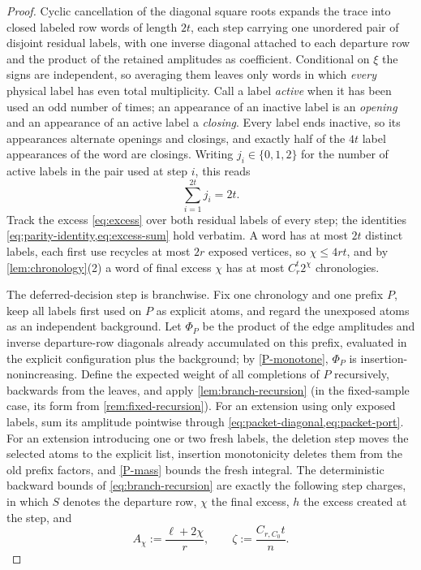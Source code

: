 \documentclass[11pt]{article}
\theoremstyle{definition}
\theoremstyle{remark}
\newcommand{\1}{\mathbf 1}
\numberwithin{equation}{section}
\begin{document}
\begin{proof}
Cyclic cancellation of the diagonal square roots expands the trace into
closed labeled row words of length $2t$, each step carrying one
unordered pair of disjoint residual labels, with one inverse diagonal
attached to each departure row and the product of the retained
amplitudes as coefficient.  Conditional on $\xi$ the signs are
independent, so averaging them leaves only words in which \emph{every}
physical label has even total multiplicity.  Call a label \emph{active}
when it has been used an odd number of times; an appearance of an
inactive label is an \emph{opening} and an appearance of an active
label a \emph{closing}.  Every label ends inactive, so its appearances
alternate openings and closings, and exactly half of the $4t$ label
appearances of the word are closings.  Writing $j_i\in\{0,1,2\}$ for
the number of active labels in the pair used at step $i$, this reads
\begin{equation}\label{eq:pair-parity}
 \sum_{i=1}^{2t}j_i=2t.
\end{equation}
Track the excess \cref{eq:excess} over both residual labels of every
step; the identities \cref{eq:parity-identity,eq:excess-sum} hold
verbatim.  A word has at most $2t$ distinct labels, each first use
recycles at most $2r$ exposed vertices, so $\chi\le4rt$, and by
\cref{lem:chronology}(2) a word of final excess $\chi$ has at most
$C_r^t2^\chi$ chronologies.

The deferred-decision step is branchwise.  Fix one chronology and one
prefix $P$, keep all labels first used on $P$ as explicit atoms, and
regard the unexposed atoms as an independent background.  Let $\Phi_P$
be the product of the edge amplitudes and inverse departure-row
diagonals already accumulated on this prefix, evaluated in the explicit
configuration plus the background; by \ref{P-monotone}, $\Phi_P$ is
insertion-nonincreasing.  Define the expected weight of all completions
of $P$ recursively, backwards from the leaves, and apply
\cref{lem:branch-recursion} (in the fixed-sample case, its form from
\cref{rem:fixed-recursion}).  For an extension using only exposed
labels, sum its amplitude pointwise through
\cref{eq:packet-diagonal,eq:packet-port}.  For an extension introducing
one or two fresh labels, the deletion step moves the selected atoms to
the explicit list, insertion monotonicity deletes them from the old
prefix factors, and \ref{P-mass} bounds the fresh integral.  The
deterministic backward bounds of \cref{eq:branch-recursion} are exactly
the following step charges, in which $S$ denotes the departure row,
$\chi$ the final excess, $h$ the excess created at the step, and
\[
 A_\chi:=\frac{\ell+2\chi}{r},
 \qquad
 \zeta:=\frac{C_{r,C_0}t}{n}.
\]


\end{proof}
\end{document}

